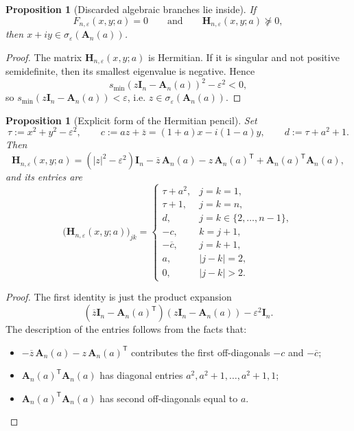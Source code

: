 \documentclass[11pt]{article}
\newtheorem{proposition}[theorem]{Proposition}
\begin{document}
\begin{proposition}[Discarded algebraic branches lie inside]\label{prop:discarded-inside}
If
\[
F_{n,\varepsilon}(x,y;a)=0
\qquad\text{and}\qquad
\mathbf H_{n,\varepsilon}(x,y;a)\not\succeq 0,
\]
then \(x+iy\in \sigma_\varepsilon(\mathbf A_n(a))\).
\end{proposition}

\begin{proof}
The matrix \(\mathbf H_{n,\varepsilon}(x,y;a)\) is Hermitian. If it is singular and not positive semidefinite, then its smallest eigenvalue is negative. Hence
\[
s_{\min}(z\mathbf I_n-\mathbf A_n(a))^2-\varepsilon^2<0,
\]
so \(s_{\min}(z\mathbf I_n-\mathbf A_n(a))<\varepsilon\), i.e. \(z\in \sigma_\varepsilon(\mathbf A_n(a))\).
\end{proof}

\begin{proposition}[Explicit form of the Hermitian pencil]\label{prop:explicit-H}
Set
\[
\tau:=x^2+y^2-\varepsilon^2,
\qquad
c:=az+\overline z=(1+a)x-i(1-a)y,
\qquad
d:=\tau+a^2+1.
\]
Then
\[
\mathbf H_{n,\varepsilon}(x,y;a)
=
(|z|^2-\varepsilon^2)\mathbf I_n-\overline z\,\mathbf A_n(a)-z\,\mathbf A_n(a)^{\mathsf T}
+\mathbf A_n(a)^{\mathsf T}\mathbf A_n(a),
\]
and its entries are
\[
\bigl(\mathbf H_{n,\varepsilon}(x,y;a)\bigr)_{jk}
=
\begin{cases}
\tau+a^2, & j=k=1,\\[1mm]
\tau+1, & j=k=n,\\[1mm]
d, & j=k\in\{2,\dots,n-1\},\\[1mm]
-c, & k=j+1,\\[1mm]
-\overline c, & j=k+1,\\[1mm]
a, & |j-k|=2,\\[1mm]
0, & |j-k|>2.
\end{cases}
\]
\end{proposition}

\begin{proof}
The first identity is just the product expansion
\[
(\overline z\mathbf I_n-\mathbf A_n(a)^{\mathsf T})(z\mathbf I_n-\mathbf A_n(a))-\varepsilon^2\mathbf I_n.
\]
The description of the entries follows from the facts that:
\begin{itemize}
\item \(-\overline z\,\mathbf A_n(a)-z\,\mathbf A_n(a)^{\mathsf T}\) contributes the first off-diagonals \(-c\) and \(-\overline c\);
\item \(\mathbf A_n(a)^{\mathsf T}\mathbf A_n(a)\) has diagonal entries \(a^2,a^2+1,\dots,a^2+1,1\);
\item \(\mathbf A_n(a)^{\mathsf T}\mathbf A_n(a)\) has second off-diagonals equal to \(a\).
\end{itemize}
\end{proof}
\end{document}
